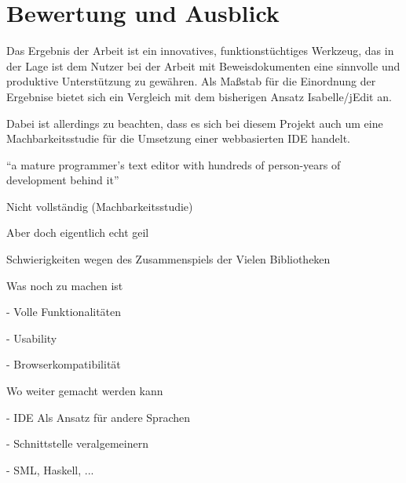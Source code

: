 \chapter{Bewertung und Ausblick}

Das Ergebnis der Arbeit ist ein innovatives, funktionstüchtiges Werkzeug, das in der Lage ist dem
Nutzer bei der Arbeit mit Beweisdokumenten eine sinnvolle und produktive Unterstützung zu gewähren.
Als Maßstab für die Einordnung der Ergebnise bietet sich ein Vergleich mit dem bisherigen Ansatz
Isabelle/jEdit an. 

Dabei ist allerdings zu beachten, dass es sich bei diesem Projekt auch um eine
Machbarkeitsstudie für die Umsetzung einer webbasierten IDE handelt.

“a mature programmer’s text editor with hundreds of person-years of development behind it”



Nicht vollständig (Machbarkeitsstudie)

Aber doch eigentlich echt geil

Schwierigkeiten wegen des Zusammenspiels der Vielen Bibliotheken

Was noch zu machen ist
 
 - Volle Funktionalitäten

 - Usability

 - Browserkompatibilität

Wo weiter gemacht werden kann

 - IDE Als Ansatz für andere Sprachen

 - Schnittstelle veralgemeinern

 - SML, Haskell, ...